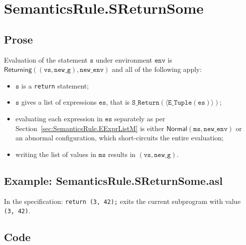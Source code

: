 \documentclass{book}
\newcommand\secref[1]{Section~\ref{sec:#1}}
\newcommand\ProseOrAbnormal[0]{or an abnormal configuration, which short-circuits the entire evaluation}
\newcommand\Normal[0]{\textsf{Normal}}
\newcommand\Returning[0]{\textsf{Returning}}
\newcommand\newenv[0]{\texttt{new\_env}}
\newcommand\env[0]{\texttt{env}}
\newcommand\newg[0]{\texttt{new\_g}}
\newcommand\vs[0]{\texttt{s}}
\newcommand\vvs[0]{\texttt{vs}}
\newcommand\vms[0]{\texttt{ms}}
\newcommand\es[0]{\texttt{es}}
\newcommand\ms[0]{\texttt{ms}}
\begin{document}

\section{SemanticsRule.SReturnSome \label{sec:SemanticsRule.SReturnSome}}
    \subsection{Prose}
    Evaluation of the statement $\vs$ under environment $\env$ is \\
    $\Returning((\vvs, \newg), \newenv)$ and all of the following apply:
    \begin{itemize}
    \item $\vs$ is a \texttt{return} statement;
    \item $\vs$ gives a list of expressions $\es$, that is $\texttt{S\_Return}(\langle\texttt{E\_Tuple}(\es)\rangle)$;
    \item evaluating each expression in $\es$ separately as per \secref{SemanticsRule.EExprListM}
    is either $\Normal(\ms, \newenv)$ \ProseOrAbnormal;
    \item writing the list of values in $\vms$ results in $(\vvs, \newg)$.
    \end{itemize}

    \subsection{Example: SemanticsRule.SReturnSome.asl}
    In the specification:
    \texttt{return (3, 42);} exits the current subprogram with value \texttt{(3, 42)}.

  \subsection{Code}
\end{document}
